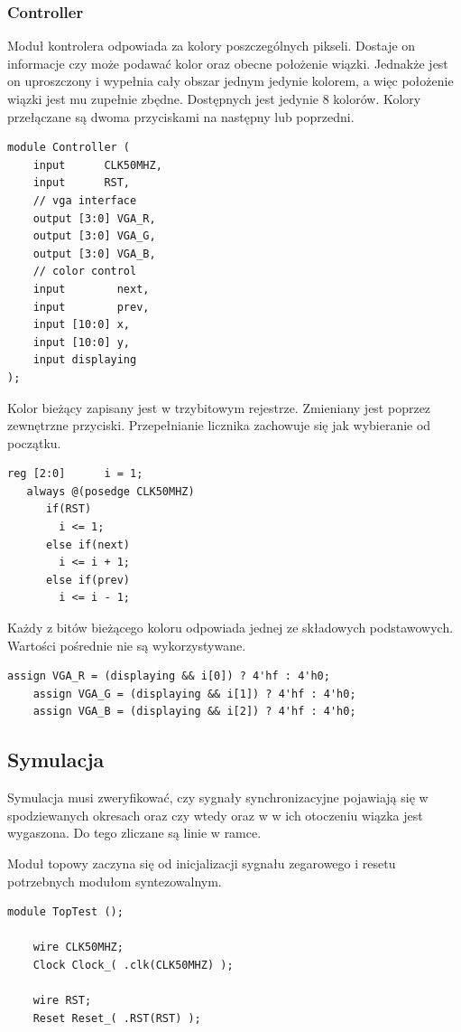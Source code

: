 \documentclass[a4paper,12pt]{article}
\begin{document}
\subsubsection{Controller}

Moduł kontrolera odpowiada za kolory poszczególnych pikseli. Dostaje on informacje czy może podawać kolor oraz obecne położenie wiązki. Jednakże jest on uproszczony i wypełnia cały obszar jednym jedynie kolorem, a więc  położenie wiązki jest mu zupełnie zbędne. Dostępnych jest jedynie 8 kolorów. Kolory przełączane są dwoma przyciskami na następny lub poprzedni.
\begin{lstlisting}[label=Syncvga,caption=Sync.v,firstnumber=49]
module Controller (
    input      CLK50MHZ,
    input      RST,
    // vga interface
    output [3:0] VGA_R,
    output [3:0] VGA_G,
    output [3:0] VGA_B,
    // color control
    input        next,
    input        prev,
    input [10:0] x,
    input [10:0] y,
    input displaying
);
\end{lstlisting}

Kolor bieżący zapisany jest w trzybitowym rejestrze. Zmieniany jest poprzez zewnętrzne przyciski. Przepełnianie licznika zachowuje się jak wybieranie od początku.
\begin{lstlisting}[label=Syncvga,caption=Sync.v,firstnumber=16]
   reg [2:0]      i = 1;
   always @(posedge CLK50MHZ)
      if(RST)
        i <= 1;
      else if(next)
        i <= i + 1;
      else if(prev)
        i <= i - 1;
\end{lstlisting}

Każdy z bitów bieżącego koloru odpowiada jednej ze składowych podstawowych. Wartości pośrednie nie są wykorzystywane.
\begin{lstlisting}[label=Syncvga,caption=Sync.v,firstnumber=25]
    assign VGA_R = (displaying && i[0]) ? 4'hf : 4'h0;
    assign VGA_G = (displaying && i[1]) ? 4'hf : 4'h0;
    assign VGA_B = (displaying && i[2]) ? 4'hf : 4'h0;
\end{lstlisting}

\subsection{Symulacja}
Symulacja musi zweryfikować, czy sygnały synchronizacyjne pojawiają się w spodziewanych okresach oraz czy wtedy oraz w w ich otoczeniu wiązka jest wygaszona. Do tego zliczane są linie w ramce.

Moduł topowy zaczyna się od inicjalizacji sygnału zegarowego i resetu potrzebnych modułom syntezowalnym.
\begin{lstlisting}[label=Syncvga,caption=Sync.v,firstnumber=3]
module TopTest ();

    wire CLK50MHZ;
    Clock Clock_( .clk(CLK50MHZ) );

    wire RST;
    Reset Reset_( .RST(RST) );
\end{lstlisting}
\end{document}
